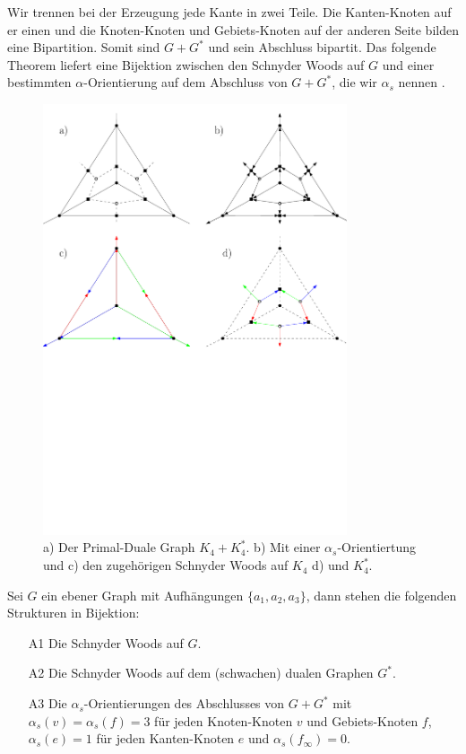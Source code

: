 Wir trennen bei der Erzeugung jede Kante in zwei Teile. Die Kanten-Knoten auf er einen und die Knoten-Knoten und Gebiets-Knoten auf der anderen Seite bilden eine Bipartition. Somit sind $G+G^*$ und sein Abschluss bipartit. Das folgende Theorem liefert eine Bijektion zwischen den Schnyder Woods auf $G$ und einer bestimmten $\alpha$-Orientierung auf dem Abschluss von $G+G^*$, die wir $\alpha_s$ nennen \cite[Propositionen 3 und 4]{felsner04}.

\begin{figure}
	\centering
	\includegraphics[width=0.8\textwidth]{alpha_ex.pdf}
  \caption{a) Der Primal-Duale Graph $K_4+K_4^*$. b) Mit einer $\alpha_s$-Orientiertung und c) den zugehörigen Schnyder Woods auf $K_4$ d) und $K^*_4$. }
  \label{alpha_ex}
\end{figure}

\begin{theorem}\label{alpha_bij}
Sei $G$ ein ebener Graph mit Aufhängungen $\{a_1,a_2,a_3\}$, dann stehen die folgenden Strukturen in Bijektion:
\begin{itemize}
\item [A1] Die Schnyder Woods auf $G$.
\item [A2] Die Schnyder Woods auf dem (schwachen) dualen Graphen $G^*$.
\item [A3] Die $\alpha_{s}$-Orientierungen des Abschlusses von $G+G^*$ mit $\alpha_s(v) = \alpha_s(f) = 3$ für jeden Knoten-Knoten $v$ und Gebiets-Knoten $f$,  $\alpha_s(e) = 1$ für jeden Kanten-Knoten $e$ und  $\alpha_s(f_\infty) = 0$.
\end{itemize}
\end{theorem}

